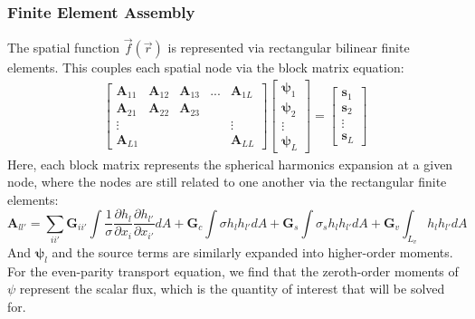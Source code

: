 \begin{frame}
  \frametitle{Finite Element Assembly}
  The spatial function $\vec{f}(\vec{r})$ is represented via rectangular bilinear finite elements. This couples each spatial node via the block matrix equation:
  \begin{align}
    \begin{bmatrix}
      \textbf{A}_{11} & \textbf{A}_{12} & \textbf{A}_{13} & ... & \textbf{A}_{1L} \\
      \textbf{A}_{21} & \textbf{A}_{22} & \textbf{A}_{23} &     &                 \\
      \vdots          &                 &                 &     & \vdots          \\
      \textbf{A}_{L1} &                 &                 &     & \textbf{A}_{LL}
    \end{bmatrix}
    \begin{bmatrix}
      \bm\psi_1 \\
      \bm\psi_2 \\
      \vdots    \\
      \bm\psi_L
    \end{bmatrix}=
    \begin{bmatrix}
      \textbf{s}_1 \\
      \textbf{s}_2 \\
      \vdots       \\
      \textbf{s}_L
    \end{bmatrix}
  \end{align}
  Here, each block matrix represents the spherical harmonics expansion at a given node, where the nodes are still related to one another via the rectangular finite elements:
  \begin{equation}
    \textbf{A}_{ll'}=\sum_{ii'}\textbf{G}_{ii'}\int\frac{1}{\sigma}\frac{\partial h_l}{\partial x_i}\frac{\partial h_{l'}}{\partial x_{i'}}dA+\textbf{G}_c\int\sigma h_lh_{l'}dA+\textbf{G}_s\int\sigma_sh_lh_{l'}dA+\textbf{G}_v\int_{L_v}h_lh_{l'}dA
  \end{equation}
  And $\bm\psi_l$ and the source terms are similarly expanded into higher-order moments. For the even-parity transport equation, we find that the zeroth-order moments of $\psi$ represent the scalar flux, which is the quantity of interest that will be solved for.
\end{frame}
